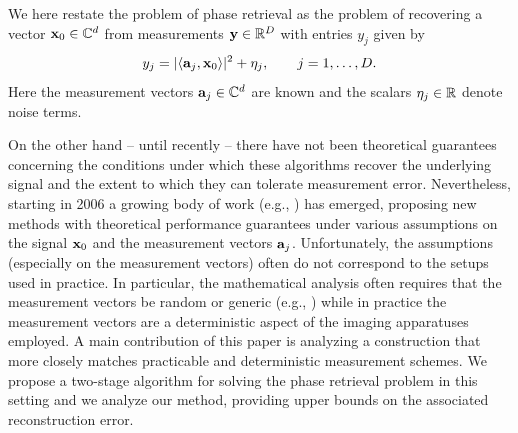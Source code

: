 

We here restate the problem of phase retrieval as the problem of recovering a vector $\mathbf x_0 \in \mathbb{C}^d$ from measurements $\mathbf y \in \mathbb{R}^D$ with entries $y_j$ given by
\begin{equation}
y_j = |\langle \mathbf{a}_j, \mathbf x_0 \rangle|^2 + \eta_j, \quad\quad j = 1,\ldots, D.\label{eq:phase_ret}
\end{equation}
Here the measurement vectors $\mathbf{a}_j\in \mathbb{C}^d$ are known and the scalars $\eta_j \in \mathbb{R}$ denote noise terms.

On the other hand -- until recently -- there have not been theoretical guarantees concerning the conditions under which these algorithms recover the underlying signal and the extent to which they can tolerate measurement error. Nevertheless, starting in 2006 a growing body of work (e.g., \cite{ balan2006signal, balan2007fast, bandeira2013near, bodmann2013stable, candes2012phaselift, eldar2012phase, IVW2015_FastPhase, li2012sparse}) has emerged, proposing new methods with theoretical performance guarantees under various assumptions on the signal $\mathbf x_0$ and the measurement vectors $\mathbf a_j$. Unfortunately, the assumptions (especially on the measurement vectors) often do not correspond to the setups used in practice. In particular, the mathematical analysis often requires that the measurement vectors be random or generic (e.g., \cite{balan2006signal, bandeira2013near, candes2012phaselift}) while in practice the measurement vectors are a deterministic aspect of the imaging apparatuses employed.  A main contribution of this paper is analyzing a construction that more closely matches practicable and deterministic measurement schemes. We propose a two-stage algorithm for solving the phase retrieval problem in this setting and we analyze our method, providing upper bounds on the associated reconstruction error. 

